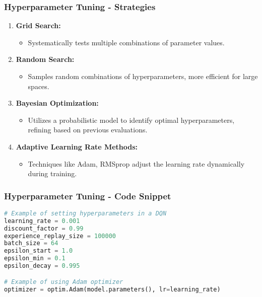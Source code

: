 \documentclass[aspectratio=169]{beamer}
\begin{document}
\begin{frame}[fragile]
    \frametitle{Hyperparameter Tuning - Strategies}
    \begin{enumerate}
        \item \textbf{Grid Search:}
            \begin{itemize}
                \item Systematically tests multiple combinations of parameter values.
            \end{itemize}
        
        \item \textbf{Random Search:}
            \begin{itemize}
                \item Samples random combinations of hyperparameters, more efficient for large spaces.
            \end{itemize}
        
        \item \textbf{Bayesian Optimization:}
            \begin{itemize}
                \item Utilizes a probabilistic model to identify optimal hyperparameters, refining based on previous evaluations.
            \end{itemize}

        \item \textbf{Adaptive Learning Rate Methods:}
            \begin{itemize}
                \item Techniques like Adam, RMSprop adjust the learning rate dynamically during training.
            \end{itemize}
    \end{enumerate}
\end{frame}

\begin{frame}[fragile]
    \frametitle{Hyperparameter Tuning - Code Snippet}
    \begin{lstlisting}[language=Python]
# Example of setting hyperparameters in a DQN
learning_rate = 0.001
discount_factor = 0.99
experience_replay_size = 100000
batch_size = 64
epsilon_start = 1.0
epsilon_min = 0.1
epsilon_decay = 0.995

# Example of using Adam optimizer
optimizer = optim.Adam(model.parameters(), lr=learning_rate)
    \end{lstlisting}
\end{frame}
\end{document}
